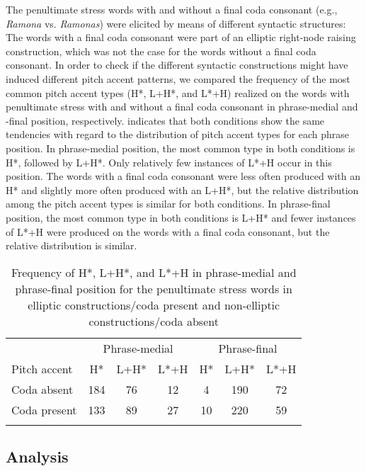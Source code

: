 \documentclass[output=paper]{langscibook}
\begin{document}
The penultimate stress words with and without a final coda consonant (e.g., \textit{Ramona} vs. \textit{Ramonas}) were elicited by means of different syntactic structures: The words with a final coda consonant were part of an elliptic right-node raising construction, which was not the case for the words without a final coda consonant. In order to check if the different syntactic constructions might have induced different pitch accent patterns, we compared the frequency of the most common pitch accent types (H*, L+H*, and L*+H) realized on the words with penultimate stress with and without a final coda consonant in phrase-medial and -final position, respectively.  indicates that both conditions show the same tendencies with regard to the distribution of pitch accent types for each phrase position. In phrase-medial position, the most common type in both conditions is H*, followed by L+H*. Only relatively few instances of L*+H occur in this position. The words with a final coda consonant were less often produced with an H* and slightly more often produced with an L+H*, but the relative distribution among the pitch accent types is similar for both conditions. In phrase-final position, the most common type in both conditions is L+H* and fewer instances of L*+H were produced on the words with a final coda consonant, but the relative distribution is similar.\largerpage[2]

\begin{table}[H]
    \caption{Frequency of H*, L+H*, and L*+H in phrase-medial and phrase-final position for the penultimate stress words in elliptic constructions\slash coda present and non-elliptic constructions\slash coda absent}
    \begin{tabular}{lcccccc}
    \lsptoprule
     & \multicolumn{3}{c}{Phrase-medial} &  \multicolumn{3}{c}{Phrase-final} \\\cmidrule(lr){2-4}\cmidrule(lr){5-7}
    Pitch accent & H* & L+H* & L*+H & H* & L+H* & L*+H \\
    \midrule
    Coda absent  & 184 & 76 & 12 & 4 & 190 & 72 \\
    Coda present & 133 & 89 & 27 & 10 & 220 & 59\\
    \lspbottomrule
    \end{tabular}
    \label{tab:Tab3}
\end{table}

\subsection{Analysis}
\end{document}
